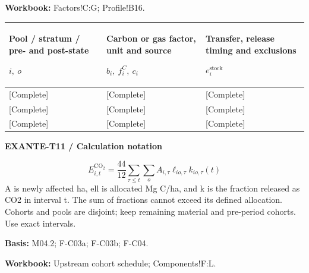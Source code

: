 \textbf{Workbook:} Factors!C:G; Profile!B16.\par\endgroup
{\sffamily\fontsize{8.3}{10.3}\selectfont\begin{longtable}{@{}P{54.83mm} P{54.83mm} P{54.83mm}@{}}
\toprule
\textbf{Pool / stratum / pre- and post-state}\par {\normalfont\fontsize{8.2}{10}\selectfont $i,\ o$} & \textbf{Carbon or gas factor, unit and source}\par {\normalfont\fontsize{8.2}{10}\selectfont $b_i,\ f_i^C,\ c_i$} & \textbf{Transfer, release timing and exclusions}\par {\normalfont\fontsize{8.2}{10}\selectfont $e_i^{\mathrm{stock}}$}\\\midrule\endhead
\rule{0pt}{8mm}[Complete] & [Complete] & [Complete]\\\hline
\rule{0pt}{8mm}[Complete] & [Complete] & [Complete]\\\hline
\rule{0pt}{8mm}[Complete] & [Complete] & [Complete]\\\hline
\end{longtable}}
\par\begingroup\sffamily\fontsize{8}{10}\selectfont\color{NEBGreen}\setlength{\parskip}{2pt}\setlength{\abovedisplayskip}{4pt}\setlength{\belowdisplayskip}{4pt}\setlength{\abovedisplayshortskip}{2pt}\setlength{\belowdisplayshortskip}{3pt}
\textbf{EXANTE-T11 / Calculation notation}\par
{\fontsize{9}{11}\selectfont\[ E^{\mathrm{CO_2}}_{i,t}=\frac{44}{12}\sum_{\tau\le t}\sum_o A_{i,\tau}\ell_{io,\tau}k_{io,\tau}(t) \]}
A is newly affected ha, ell is allocated Mg C/ha, and k is the fraction released as CO2 in interval t. The sum of fractions cannot exceed its defined allocation. Cohorts and pools are disjoint; keep remaining material and pre-period cohorts. Use exact intervals.\par
\textbf{Basis:} M04.2; F-C03a; F-C03b; F-C04.\par
\textbf{Workbook:} Upstream cohort schedule; Components!F:L.\par\endgroup
